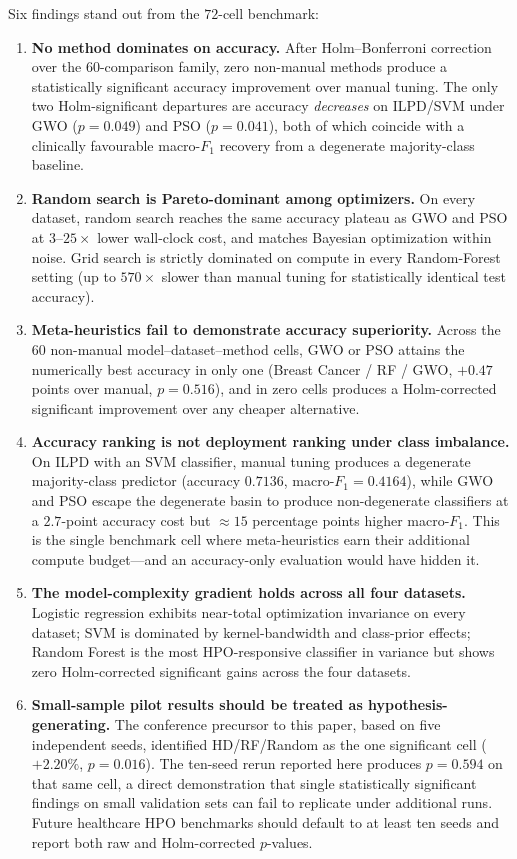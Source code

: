 \documentclass[letterpaper, 10 pt, conference]{ieeeconf}
\begin{document}
Six findings stand out from the $72$-cell benchmark:
\begin{enumerate}
	\item \textbf{No method dominates on accuracy.} After Holm--Bonferroni correction over the $60$-comparison family, zero non-manual methods produce a statistically significant accuracy improvement over manual tuning. The only two Holm-significant departures are accuracy \emph{decreases} on ILPD/SVM under GWO ($p = 0.049$) and PSO ($p = 0.041$), both of which coincide with a clinically favourable macro-$F_1$ recovery from a degenerate majority-class baseline.
	\item \textbf{Random search is Pareto-dominant among optimizers.} On every dataset, random search reaches the same accuracy plateau as GWO and PSO at $3$--$25\times$ lower wall-clock cost, and matches Bayesian optimization within noise. Grid search is strictly dominated on compute in every Random-Forest setting (up to $570\times$ slower than manual tuning for statistically identical test accuracy).
	\item \textbf{Meta-heuristics fail to demonstrate accuracy superiority.} Across the $60$ non-manual model--dataset--method cells, GWO or PSO attains the numerically best accuracy in only one (Breast Cancer / RF / GWO, $+0.47$ points over manual, $p = 0.516$), and in zero cells produces a Holm-corrected significant improvement over any cheaper alternative.
	\item \textbf{Accuracy ranking is not deployment ranking under class imbalance.} On ILPD with an SVM classifier, manual tuning produces a degenerate majority-class predictor (accuracy $0.7136$, macro-$F_1 = 0.4164$), while GWO and PSO escape the degenerate basin to produce non-degenerate classifiers at a $2.7$-point accuracy cost but $\approx 15$ percentage points higher macro-$F_1$. This is the single benchmark cell where meta-heuristics earn their additional compute budget---and an accuracy-only evaluation would have hidden it.
	\item \textbf{The model-complexity gradient holds across all four datasets.} Logistic regression exhibits near-total optimization invariance on every dataset; SVM is dominated by kernel-bandwidth and class-prior effects; Random Forest is the most HPO-responsive classifier in variance but shows zero Holm-corrected significant gains across the four datasets.
	\item \textbf{Small-sample pilot results should be treated as hypothesis-generating.} The conference precursor to this paper, based on five independent seeds, identified HD/RF/Random as the one significant cell ($+2.20\%$, $p = 0.016$). The ten-seed rerun reported here produces $p = 0.594$ on that same cell, a direct demonstration that single statistically significant findings on small validation sets can fail to replicate under additional runs. Future healthcare HPO benchmarks should default to at least ten seeds and report both raw and Holm-corrected $p$-values.
\end{enumerate}
\end{document}
